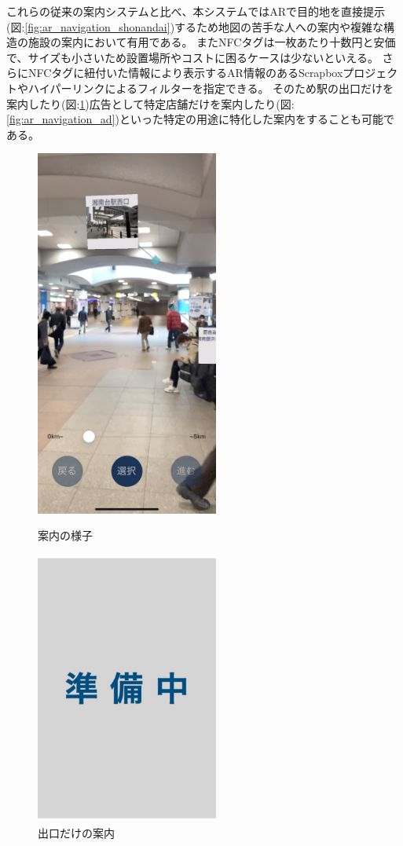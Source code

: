 これらの従来の案内システムと比べ、本システムではARで目的地を直接提示(図:\ref{fig:ar_navigation_shonandai})するため地図の苦手な人への案内や複雑な構造の施設の案内において有用である。
またNFCタグは一枚あたり十数円と安価で、サイズも小さいため設置場所やコストに困るケースは少ないといえる。
さらにNFCタグに紐付いた情報により表示するAR情報のあるScrapboxプロジェクトやハイパーリンクによるフィルターを指定できる。
そのため駅の出口だけを案内したり(図:\ref{fig:ar_navigation_exit})広告として特定店舗だけを案内したり(図:\ref{fig:ar_navigation_ad})といった特定の用途に特化した案内をすることも可能である。

\begin{figure}[h]
  \begin{minipage}{0.5\hsize}
    \centering
    \includegraphics[width=60mm]{images/ar_navigation_shonandai.jpg}
    \caption{案内の様子} \label{fig:ar_navigation_shonandai}
  \end{minipage}
  \begin{minipage}{0.5\hsize}
    \centering
    \includegraphics[width=60mm]{images/wip2.jpg}
    \caption{出口だけの案内} \label{fig:ar_navigation_exit}
  \end{minipage}
\end{figure}

